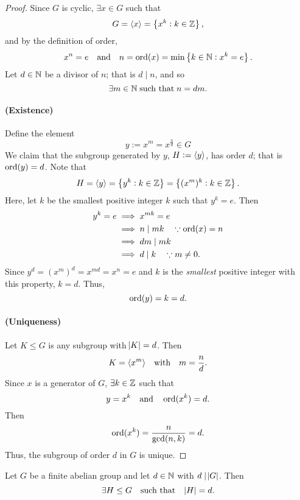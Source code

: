 \documentclass[11pt,openany]{article}
\begin{document}
\begin{proof}
	Since $G$ is cyclic, $\exists x\in G$ such that \[
	G=\langle x \rangle=\set[1]{x^k:k\in\mathbb{Z}},
	\] and by the definition of order, \[
	x^n=e\quad\text{and\quad} n=\operatorname*{ord}(x)=\min\set[1]{k\in\mathbb{N}:x^k=e}.
	\] Let $d\in\mathbb{N}$ be a divisor of $n$; that is $d\mid n$, and so \[
	\exists m\in\mathbb{N}\;\text{such that}\; n=dm.
	\]
	\paragraph{(Existence)} Define the element \[
	y:=x^{m}=x^{\frac{n}{d}}\in G
	\] We claim that the subgroup generated by $y$, $H:=\langle y \rangle$, has order $d$; that is $\operatorname*{ord}(y)=d$. Note that \[
	H=\langle y \rangle=\set[1]{y^k:k\in\mathbb{Z}}=\set[1]{(x^{m})^k:k\in\mathbb{Z}}.
	\] Here, let $k$ be the smallest positive integer $k$ such that $y^k=e$. Then \begin{align*}
		y^k=e &\implies x^{mk}=e\\
		&\implies n\mid mk\quad\because \operatorname*{ord}(x)=n\\
		&\implies dm\mid mk \\
		&\implies d\mid k\quad\because m\neq 0.
	\end{align*} Since $y^d=(x^m)^{d}=x^{md}=x^n=e$ and $k$ is the \emph{smallest} positive integer with this property, $k=d$. Thus, \[
	\operatorname*{ord}(y)=k=d.
	\]
	\paragraph{(Uniqueness)} Let $K\leq G$ is any subgroup with $\abs{K}=d$. Then \[
	K=\langle x^m \rangle\quad\text{with}\quad m=\frac{n}{d}.
	\] Since $x$ is a generator of $G$, $\exists k\in \mathbb{Z}$ such that \[
	y=x^k\quad\text{and}\quad\operatorname*{ord}(x^k)=d.
	\] Then \[
	\operatorname*{ord}(x^k)=\frac{n}{\gcd(n,k)}=d.
	\] Thus, the subgroup of order $d$ in $G$ is unique.
\end{proof}

\begin{remark*}
Let $G$ be a finite abelian group and let $d\in\mathbb{N}$ with $d\mid \abs{G}$. Then \[
\exists H\leq G\quad\text{such that}\quad \abs{H}=d.
\] 
\end{remark*}
\end{document}
